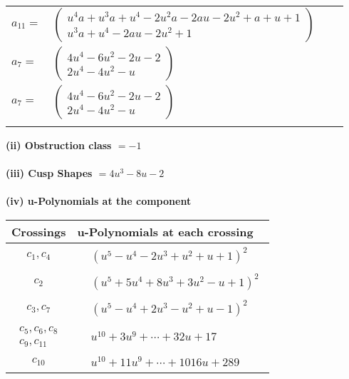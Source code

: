 \documentclass[1p]{elsarticle_modified}
\theoremstyle{definition}
\begin{document}
\begin{tabular}{m{7pt} m{180pt} m{7pt} m{180pt} }
\flushright $a_{11}=$&$\begin{pmatrix}u^4 a+u^3 a+u^4-2 u^2 a-2 a u-2 u^2+a+u+1\\u^3 a+u^4-2 a u-2 u^2+1\end{pmatrix}$ \\
\flushright $a_{7}=$&$\begin{pmatrix}4 u^4-6 u^2-2 u-2\\2 u^4-4 u^2- u\end{pmatrix}$\\ \flushright $a_{7}=$&$\begin{pmatrix}4 u^4-6 u^2-2 u-2\\2 u^4-4 u^2- u\end{pmatrix}$\\&\end{tabular}
\flushleft \textbf{(ii) Obstruction class $= -1$}\\~\\
\flushleft \textbf{(iii) Cusp Shapes $= 4 u^3-8 u-2$}\\~\\
\newpage\renewcommand{\arraystretch}{1}
\flushleft \textbf{(iv) u-Polynomials at the component}\newline \\
\begin{tabular}{m{50pt}|m{274pt}}
Crossings & \hspace{64pt}u-Polynomials at each crossing \\
\hline $$\begin{aligned}c_{1},c_{4}\end{aligned}$$&$\begin{aligned}
&(u^5- u^4-2 u^3+u^2+u+1)^2
\end{aligned}$\\
\hline $$\begin{aligned}c_{2}\end{aligned}$$&$\begin{aligned}
&(u^5+5 u^4+8 u^3+3 u^2- u+1)^2
\end{aligned}$\\
\hline $$\begin{aligned}c_{3},c_{7}\end{aligned}$$&$\begin{aligned}
&(u^5- u^4+2 u^3- u^2+u-1)^2
\end{aligned}$\\
\hline $$\begin{aligned}c_{5},c_{6},c_{8}\\c_{9},c_{11}\end{aligned}$$&$\begin{aligned}
&u^{10}+3 u^9+\cdots+32 u+17
\end{aligned}$\\
\hline $$\begin{aligned}c_{10}\end{aligned}$$&$\begin{aligned}
&u^{10}+11 u^9+\cdots+1016 u+289
\end{aligned}$\\
\hline
\end{tabular}\\~\\
\end{document}

